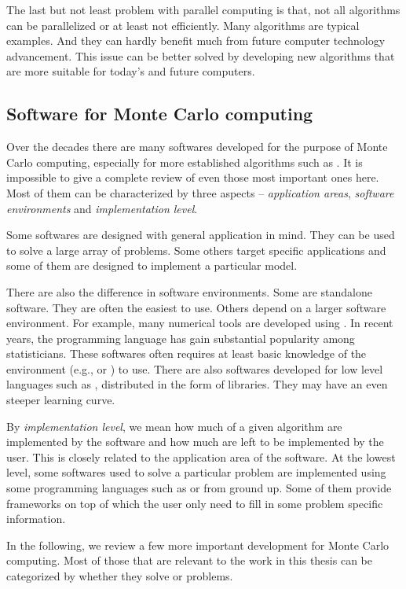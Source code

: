 The last but not least problem with parallel computing is that, not all algorithms can be parallelized or at least not efficiently. Many \mcmc algorithms are typical examples. And they can hardly benefit much from future computer technology advancement. This issue can be better solved by developing new algorithms that are more suitable for today's and future computers.

\subsection{Software for Monte Carlo computing}
\label{sub:Softwares for Monte Carlo computing}

Over the decades there are many softwares developed for the purpose of Monte Carlo computing, especially for more established algorithms such as \mcmc. It is impossible to give a complete review of even those most important ones here. Most of them can be characterized by three aspects -- \emph{application areas}, \emph{software environments} and \emph{implementation level}.

Some softwares are designed with general application in mind. They can be used to solve a large array of problems. Some others target specific applications and some of them are designed to implement a particular model.

There are also the difference in software environments. Some are standalone software. They are often the easiest to use. Others depend on a larger software environment. For example, many numerical tools are developed using \matlab \cite{matlab}. In recent years, the \rlang programming language \cite{rlang} has gain substantial popularity among statisticians. These softwares often requires at least basic knowledge of the environment (e.g., \matlab or \rlang) to use. There are also softwares developed for low level languages such as \cpp, distributed in the form of libraries. They may have an even steeper learning curve.

By \emph{implementation level}, we mean how much of a given algorithm are implemented by the software and how much are left to be implemented by the user. This is closely related to the application area of the software. At the lowest level, some softwares used to solve a particular problem are implemented using some programming languages such as \rlang or \cpp from ground up. Some of them provide frameworks on top of which the user only need to fill in some problem specific information.

In the following, we review a few more important development for Monte Carlo computing. Most of those that are relevant to the work in this thesis can be categorized by whether they solve \mcmc or \smc problems.

